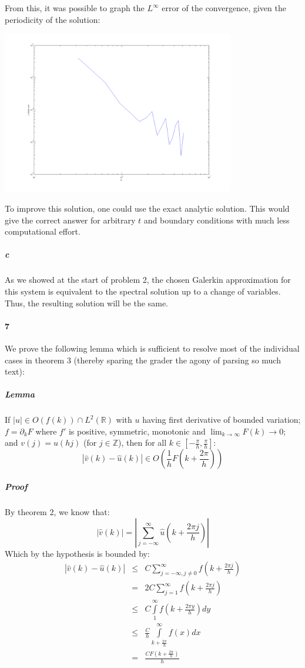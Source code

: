 \documentclass{article}
\begin{document}
From this, it was possible to graph the $L^\infty$ error of the convergence, given the periodicity of the solution:

\begin{center}
\includegraphics[width=4in]{hw1_part2_p6b.png}
\end{center}

To improve this solution, one could use the exact analytic solution.  This would give the correct answer for arbitrary $t$ and boundary conditions with much less computational effort.

\subparagraph{c}
As we showed at the start of problem 2, the chosen Galerkin approximation for this system is equivalent to the spectral solution up to a change of variables.  Thus, the resulting solution will be the same.

\paragraph{7}

We prove the following lemma which is sufficient to resolve most of the individual cases in theorem 3 (thereby sparing the grader the agony of parsing so much text):

\subparagraph{Lemma}
If $|u| \in O(f(k)) \cap L^2(\mathbb{R})$ with $u$ having first derivative of bounded variation; $f = \partial_k F$ where $f'$ is positive, symmetric, monotonic and $\lim_{k \to \infty}F(k) \to 0$; and $v(j) = u(h j)$ (for $j \in \mathbb{Z}$), then for all $k \in [- \frac{\pi}{h}, \frac{\pi}{h} ]$:
\[ | \hat{v}(k) - \hat{u}(k) | \in O\left( \frac{1}{h} F\left(k + \frac{2 \pi}{h}\right) \right) \]

\subparagraph{Proof}
By theorem 2, we know that:
\[ |\hat{v}(k)| = |\sum \limits_{j=-\infty}^{\infty} \hat{u}(k + \frac{2 \pi j}{h})| \]
Which by the hypothesis is bounded by:
\begin{eqnarray*}
|\hat{v}(k) - \hat{u}(k)| & \leq & C \sum \limits_{j=-\infty, j \neq 0}^{\infty} f \left(k + \frac{2 \pi j}{h} \right) \\
& = & 2C  \sum \limits_{j=1}^{\infty} f \left( k + \frac{2 \pi j}{h} \right) \\
& \leq & C \int \limits_{1}^{\infty} f \left( k + \frac{2 \pi y}{h} \right) dy \\
& \leq & \frac{C}{h} \int \limits_{k + \frac{2 \pi}{h}}^{\infty} f(x) dx \\
& = & \frac{C F \left(k + \frac{2 \pi}{h} \right) } {h}
\end{eqnarray*}
\end{document}
